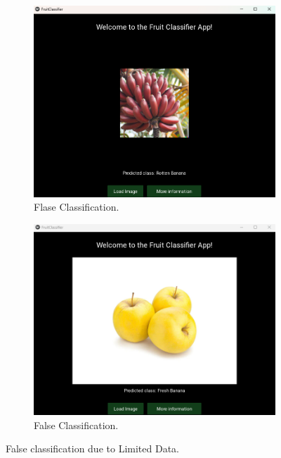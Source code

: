 \documentclass[conference]{IEEEtran}
\begin{document}
\begin{figure}[h]
    \centering
    \begin{subfigure}[b]{0.48\linewidth}
        \centering
        \includegraphics[width=\linewidth]{Red Banana not seen as banana.png}
        \caption{Flase Classification.}
        \label{figFA}
    \end{subfigure}
    \hfill
    \begin{subfigure}[b]{0.48\linewidth}
        \centering
        \includegraphics[width=\linewidth]{Yellow Apples not seen as apples.png}
        \caption{False Classification.}
        \label{figFB}
    \end{subfigure}
    \caption{False classification due to Limited Data.}
    \label{FigLimDataV}
\end{figure}
\end{document}
